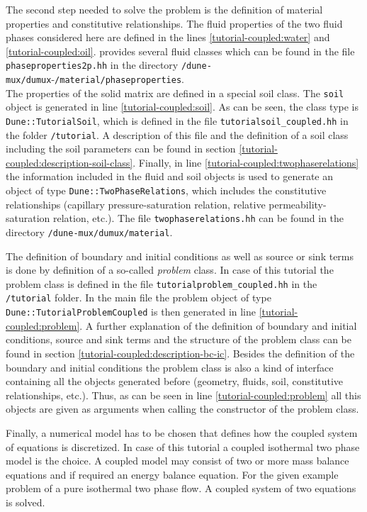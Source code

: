 The second step needed to solve the problem is the definition of material properties and constitutive relationships. The fluid properties of the two fluid phases considered here are defined in the lines \ref{tutorial-coupled:water} and \ref{tutorial-coupled:oil}. \Dumux provides several fluid classes which can be found in the file \texttt{phaseproperties2p.hh} in the directory \texttt{/dune-mux/dumux}-\texttt{/material/phaseproperties}. \\
The properties of the solid matrix are defined in a special soil class. The \texttt{soil} object is generated in line \ref{tutorial-coupled:soil}. As can be seen, the class type is \texttt{Dune::TutorialSoil}, which is defined in the file \texttt{tutorialsoil\_coupled.hh} in the folder \texttt{/tutorial}. A description of this file and the definition of a soil class including the soil parameters can be found in section \ref{tutorial-coupled:description-soil-class}. Finally, in line \ref{tutorial-coupled:twophaserelations} the information included in the fluid and soil objects is used to generate an object of type \texttt{Dune::TwoPhaseRelations}, which includes the constitutive relationships (capillary pressure-saturation relation, relative permeability-saturation relation, etc.). The file \texttt{twophaserelations.hh} can be found in the directory \texttt{/dune-mux/dumux/material}.

The definition of boundary and initial conditions as well as source or sink terms is done by definition of a so-called \textit{problem} class. In case of this tutorial the problem class is defined in the file \texttt{tutorialproblem\_coupled.hh} in the \texttt{/tutorial} folder. In the main file the problem object of type \texttt{Dune::TutorialProblemCoupled} is then generated in line \ref{tutorial-coupled:problem}. A further explanation of the definition of boundary and initial conditions, source and sink terms and the structure of the problem class can be found in section \ref{tutorial-coupled:description-bc-ic}. Besides the definition of the boundary and initial conditions the problem class is also a kind of interface containing all the objects generated before (geometry, fluids, soil, constitutive relationships, etc.). Thus, as can be seen in line \ref{tutorial-coupled:problem} all this objects are given as arguments when calling the constructor of the problem class.     

Finally, a numerical model has to be chosen that defines how the coupled system of equations is discretized. In case of this tutorial a coupled isothermal two phase model is the choice. A coupled model may consist of two or more mass balance equations and if required an energy balance equation. For the given example problem of a pure isothermal two phase flow. A coupled system of two equations is solved. 

